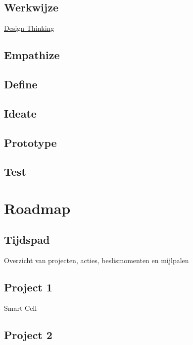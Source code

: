 \documentclass[]{book}
\begin{document}
\section{Werkwijze}\label{werkwijze}

\href{https://dschool.stanford.edu/}{Design Thinking}

\section{Empathize}\label{empathize}

\section{Define}\label{define}

\section{Ideate}\label{ideate}

\section{Prototype}\label{prototype}

\section{Test}\label{test}

\chapter{Roadmap}\label{roadmap}

\section{Tijdspad}\label{tijdspad}

Overzicht van projecten, acties, beslismomenten en mijlpalen

\section{Project 1}\label{project-1}

Smart Cell

\section{Project 2}\label{project-2}
\end{document}
